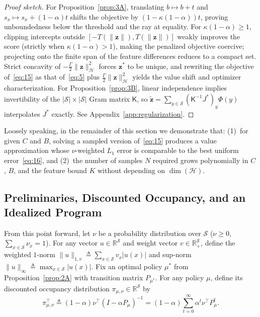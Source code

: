 \documentclass[11pt,letterpaper]{article}
\newcommand{\R}{\mathbb{R}}
\newcommand{\norm}[1]{\lVert #1\rVert}
\newcommand{\defeq}{\triangleq}
\theoremstyle{definition}
\begin{document}
\begin{proof}[Proof sketch]
For Proposition~\ref{prop:3A}, translating $b\mapsto b+t$ and $s_x\mapsto s_x+(1-\alpha)t$ shifts the objective by $(1-\kappa(1-\alpha))t$, proving unboundedness below the threshold and the ray at equality. For $\kappa(1-\alpha)\ge 1$, clipping intercepts outside $[-T(\norm{\mathbf{z}}),T(\norm{\mathbf{z}})]$ weakly improves the score (strictly when $\kappa(1-\alpha)>1$), making the penalized objective coercive; projecting onto the finite span of the feature differences reduces to a compact set. Strict concavity of $-\frac{\Gamma}{2}\norm{\mathbf{z}}_{\mathcal{H}}^2$ forces $\mathbf{z}^*$ to be unique, and rewriting the objective of~\eqref{eq:15} as that of~\eqref{eq:5} plus $\frac{\Gamma}{2}\norm{\mathbf{z}}_{\mathcal{H}}^2$ yields the value shift and optimizer characterization. For Proposition~\ref{prop:3B}, linear independence implies invertibility of the $|\mathcal{S}|\times|\mathcal{S}|$ Gram matrix $\mathsf{K}$, so $\tilde{\mathbf{z}} = \sum_{y\in\mathcal{S}} (\mathsf{K}^{-1}J^*)_y \Phi(y)$ interpolates $J^*$ exactly. See Appendix~\ref{app:regularization}.
\end{proof}

Loosely speaking, in the remainder of this section we demonstrate that: (1)~for given $C$ and $B$, solving a sampled version of~\eqref{eq:15} produces a value approximation whose $\nu$-weighted $L_1$ error is comparable to the best uniform error~\eqref{eq:16}, and (2)~the number of samples $N$ required grows polynomially in $C$, $B$, and the feature bound $K$ without depending on $\dim(\mathcal{H})$.

\subsection{Preliminaries, Discounted Occupancy, and an Idealized Program}
\label{sec:idealized}

From this point forward, let $\nu$ be a probability distribution over $\mathcal{S}$ ($\nu \ge 0$, $\sum_{x\in\mathcal{S}}\nu_x = 1$). For any vector $u\in\R^{\mathcal{S}}$ and weight vector $v\in\R_+^{\mathcal{S}}$, define the weighted $1$-norm $\norm{u}_{1,v} \defeq \sum_{x\in\mathcal{S}} v_x |u(x)|$ and sup-norm $\norm{u}_\infty \defeq \max_{x\in\mathcal{S}}|u(x)|$. Fix an optimal policy $\mu^*$ from Proposition~\ref{prop:2A} with transition matrix $P_{\mu^*}$. For any policy $\mu$, define its discounted occupancy distribution $\pi_{\mu,\nu}\in\R^{\mathcal{S}}$ by
\begin{equation}
 \pi_{\mu,\nu}^\top \defeq (1-\alpha)\nu^\top (I - \alpha P_\mu)^{-1}
 = (1-\alpha)\sum_{t=0}^{\infty} \alpha^t \nu^\top P_\mu^t.
 \tag{17}\label{eq:17}
\end{equation}
\end{document}

